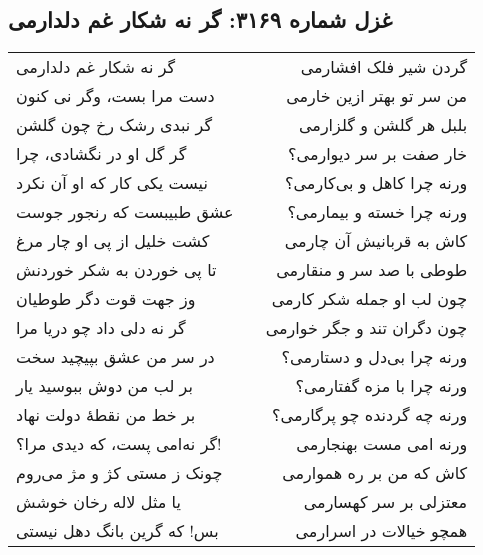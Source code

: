 \begin{center}
\section*{غزل شماره ۳۱۶۹: گر نه شکار غم دلدارمی}
\label{sec:3169}
\begin{longtable}{l p{0.5cm} r}
گر نه شکار غم دلدارمی
&&
گردن شیر فلک افشارمی
\\
دست مرا بست، وگر نی کنون
&&
من سر تو بهتر ازین خارمی
\\
گر نبدی رشک رخ چون گلشن
&&
بلبل هر گلشن و گلزارمی
\\
گر گل او در نگشادی، چرا
&&
خار صفت بر سر دیوارمی؟
\\
نیست یکی کار که او آن نکرد
&&
ورنه چرا کاهل و بی‌کارمی؟
\\
عشق طبیبست که رنجور جوست
&&
ورنه چرا خسته و بیمارمی؟
\\
کشت خلیل از پی او چار مرغ
&&
کاش به قربانیش آن چارمی
\\
تا پی خوردن به شکر خوردنش
&&
طوطی با صد سر و منقارمی
\\
وز جهت قوت دگر طوطیان
&&
چون لب او جمله شکر کارمی
\\
گر نه دلی داد چو دریا مرا
&&
چون دگران تند و جگر خوارمی
\\
در سر من عشق بپیچید سخت
&&
ورنه چرا بی‌دل و دستارمی؟
\\
بر لب من دوش ببوسید یار
&&
ورنه چرا با مزه گفتارمی؟
\\
بر خط من نقطهٔ دولت نهاد
&&
ورنه چه گردنده چو پرگارمی؟
\\
گر نه‌امی پست، که دیدی مرا؟!
&&
ورنه امی مست بهنجارمی
\\
چونک ز مستی کژ و مژ می‌روم
&&
کاش که من بر ره هموارمی
\\
یا مثل لاله رخان خوشش
&&
معتزلی بر سر کهسارمی
\\
بس! که گرین بانگ دهل نیستی
&&
همچو خیالات در اسرارمی
\\
\end{longtable}
\end{center}
